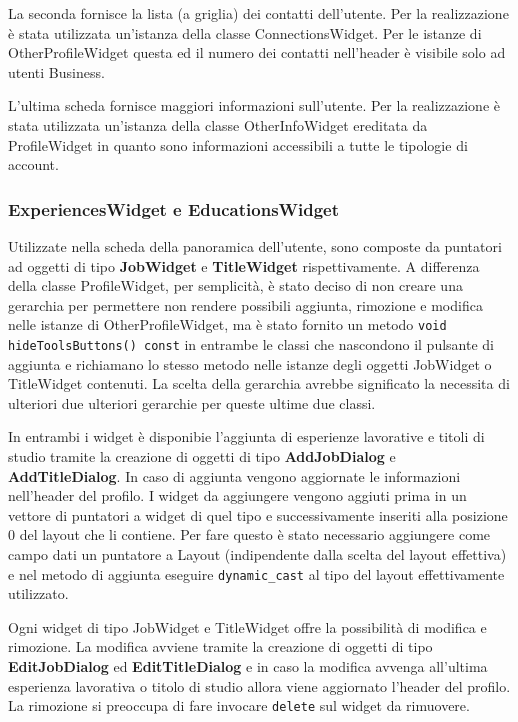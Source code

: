 \documentclass[a4paper]{article}
\begin{document}
La seconda fornisce la lista (a griglia) dei contatti dell'utente. Per la realizzazione è stata utilizzata un'istanza della classe ConnectionsWidget. Per le istanze di OtherProfileWidget questa ed il numero dei contatti nell'header è visibile solo ad utenti Business.

L'ultima scheda fornisce maggiori informazioni sull'utente. Per la realizzazione è stata utilizzata un'istanza della classe OtherInfoWidget ereditata da ProfileWidget in quanto sono informazioni accessibili a tutte le tipologie di account.

\subsubsection*{ExperiencesWidget e EducationsWidget}
Utilizzate nella scheda della panoramica dell'utente, sono composte da puntatori ad oggetti di tipo \textbf{JobWidget} e \textbf{TitleWidget} rispettivamente. A differenza della classe ProfileWidget, per semplicità, è stato deciso di non creare una gerarchia per permettere non rendere possibili aggiunta, rimozione e modifica nelle istanze di OtherProfileWidget, ma è stato fornito un metodo \texttt{void hideToolsButtons() const} in entrambe le classi che nascondono il pulsante di aggiunta e richiamano lo stesso metodo nelle istanze degli oggetti JobWidget o TitleWidget contenuti. La scelta della gerarchia avrebbe significato la necessita di ulteriori due ulteriori gerarchie per queste ultime due classi.

In entrambi i widget è disponibie l'aggiunta di esperienze lavorative e titoli di studio tramite la creazione di oggetti di tipo \textbf{AddJobDialog} e \textbf{AddTitleDialog}. In caso di aggiunta vengono aggiornate le informazioni nell'header del profilo. I widget da aggiungere vengono aggiuti prima in un vettore di puntatori a widget di quel tipo e successivamente inseriti alla posizione 0 del layout che li contiene. Per fare questo è stato necessario aggiungere come campo dati un puntatore a Layout (indipendente dalla scelta del layout effettiva) e nel metodo di aggiunta eseguire \texttt{dynamic\_cast} al tipo del layout effettivamente utilizzato.

Ogni widget di tipo JobWidget e TitleWidget offre la possibilità di modifica e rimozione. La modifica avviene tramite la creazione di oggetti di tipo \textbf{EditJobDialog} ed \textbf{EditTitleDialog} e in caso la modifica avvenga all'ultima esperienza lavorativa o titolo di studio allora viene aggiornato l'header del profilo. La rimozione si preoccupa di fare invocare \texttt{delete} sul widget da rimuovere.
\end{document}
